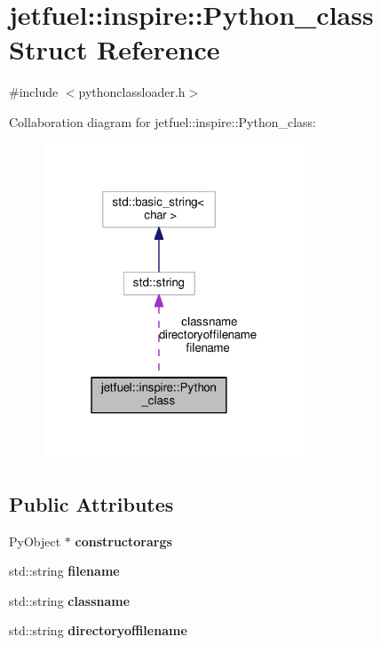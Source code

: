 \hypertarget{structjetfuel_1_1inspire_1_1Python__class}{}\section{jetfuel\+:\+:inspire\+:\+:Python\+\_\+class Struct Reference}
\label{structjetfuel_1_1inspire_1_1Python__class}


{\ttfamily \#include $<$pythonclassloader.\+h$>$}



Collaboration diagram for jetfuel\+:\+:inspire\+:\+:Python\+\_\+class\+:\nopagebreak
\begin{figure}[H]
\begin{center}
\leavevmode
\includegraphics[width=220pt]{structjetfuel_1_1inspire_1_1Python__class__coll__graph}
\end{center}
\end{figure}
\subsection*{Public Attributes}
\begin{DoxyCompactItemize}
\item 
\mbox{\label{structjetfuel_1_1inspire_1_1Python__class_ace064af1cb731082b6b28cd0c7fbf354}} 
Py\+Object $\ast$ {\bfseries constructorargs}
\item 
\mbox{\label{structjetfuel_1_1inspire_1_1Python__class_ac2ae44bee8c12dc57d0e3b7b816dc14e}} 
std\+::string {\bfseries filename}
\item 
\mbox{\label{structjetfuel_1_1inspire_1_1Python__class_a44270e68f3642d9a268ff4ae726e65f0}} 
std\+::string {\bfseries classname}
\item 
\mbox{\label{structjetfuel_1_1inspire_1_1Python__class_a5ce967f2eb9997141355a6eb05113063}} 
std\+::string {\bfseries directoryoffilename}
\end{DoxyCompactItemize}


